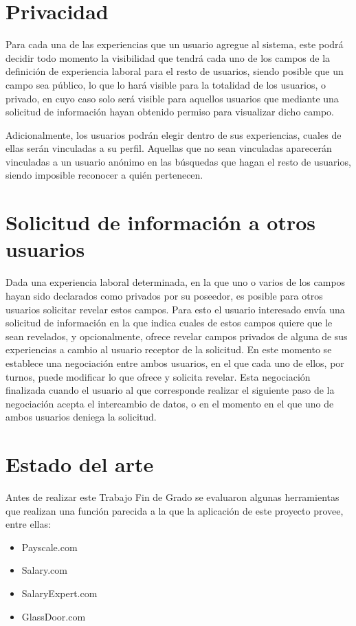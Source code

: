 \documentclass[a4paper, 12pt]{book}
\begin{document}
    \section{Privacidad}
    \label{sec:intro_privacity}
    Para cada una de las experiencias que un usuario agregue al sistema, este podrá decidir todo momento la visibilidad que tendrá cada uno de los campos de la definición de experiencia laboral para el resto de usuarios, siendo posible que un campo sea público, lo que lo hará visible para la totalidad de los usuarios, o privado, en cuyo caso solo será visible para aquellos usuarios que mediante una solicitud de información hayan obtenido permiso para visualizar dicho campo.

    Adicionalmente, los usuarios podrán elegir dentro de sus experiencias, cuales de ellas serán vinculadas a su perfil. Aquellas que no sean vinculadas aparecerán vinculadas a un usuario anónimo en las búsquedas que hagan el resto de usuarios, siendo imposible reconocer a quién pertenecen.


    \section{Solicitud de información a otros usuarios}
    \label{sec:intro_inforequest}
    Dada una experiencia laboral determinada, en la que uno o varios de los campos hayan sido declarados como privados por su poseedor, es posible para otros usuarios solicitar revelar estos campos.
    Para esto el usuario interesado envía una solicitud de información en la que indica cuales de estos campos quiere que le sean revelados, y opcionalmente, ofrece revelar campos privados de alguna de sus experiencias a cambio al usuario receptor de la solicitud.
    En este momento se establece una negociación entre ambos usuarios, en el que cada uno de ellos, por turnos, puede modificar lo que ofrece y solicita revelar. Esta negociación finalizada cuando el usuario al que corresponde realizar el siguiente paso de la negociación acepta el intercambio de datos, o en el momento en el que uno de ambos usuarios deniega la solicitud.


    \section{Estado del arte}
    \label{sec:estado_arte}
    Antes de realizar este Trabajo Fin de Grado se evaluaron algunas herramientas que realizan una función parecida a la que
    la aplicación de este proyecto provee, entre ellas:
    \begin{itemize}
        \item Payscale.com~\cite{bib:payscale}
        \item Salary.com~\cite{bib:salarycom}
        \item SalaryExpert.com~\cite{bib:salaryexpert}
        \item GlassDoor.com~\cite{bib:glassdoor}
    \end{itemize}
\end{document}
